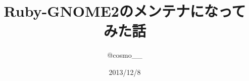 \documentclass[18pt,compress,dvipdfm]{beamer}
\begin{document}
\title{Ruby-GNOME2のメンテナになってみた話}
\author{@cosmo\_\_}
\date{2013/12/8}
\maketitle










\end{document}
